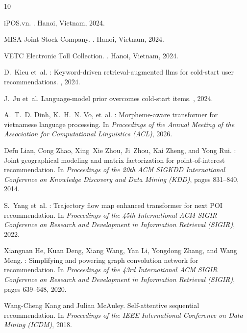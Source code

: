 \documentclass[acmsmall,screen]{acmart}
\begin{document}
\begin{thebibliography}{10}

{iPOS.vn}.
.
\newblock Hanoi, Vietnam, 2024.

{MISA Joint Stock Company}.
.
\newblock Hanoi, Vietnam, 2024.

{VETC Electronic Toll Collection}.
.
\newblock Hanoi, Vietnam, 2024.

D.~Kieu et~al.
: Keyword-driven retrieval-augmented llms for cold-start
  user recommendations.
, 2024.

J.~Ju et~al.
\newblock Language-model prior overcomes cold-start items.
, 2024.

A.~T.~D. Dinh, K.~H.~N. Vo, et~al.
: Morpheme-aware transformer for vietnamese language
  processing.
\newblock In {\em Proceedings of the Annual Meeting of the Association for
  Computational Linguistics (ACL)}, 2026.

Defu Lian, Cong Zhao, Xing~Xie Zhou, Ji~Zhou, Kai Zheng, and Yong Rui.
: Joint geographical modeling and matrix factorization for
  point-of-interest recommendation.
\newblock In {\em Proceedings of the 20th ACM SIGKDD International Conference
  on Knowledge Discovery and Data Mining (KDD)}, pages 831--840, 2014.

S.~Yang et~al.
: Trajectory flow map enhanced transformer for next {POI}
  recommendation.
\newblock In {\em Proceedings of the 45th International ACM SIGIR Conference on
  Research and Development in Information Retrieval (SIGIR)}, 2022.

Xiangnan He, Kuan Deng, Xiang Wang, Yan Li, Yongdong Zhang, and Wang Meng.
: Simplifying and powering graph convolution network for
  recommendation.
\newblock In {\em Proceedings of the 43rd International ACM SIGIR Conference on
  Research and Development in Information Retrieval (SIGIR)}, pages 639--648,
  2020.

Wang-Cheng Kang and Julian McAuley.
\newblock Self-attentive sequential recommendation.
\newblock In {\em Proceedings of the IEEE International Conference on Data
  Mining (ICDM)}, 2018.


\end{thebibliography}
\end{document}
